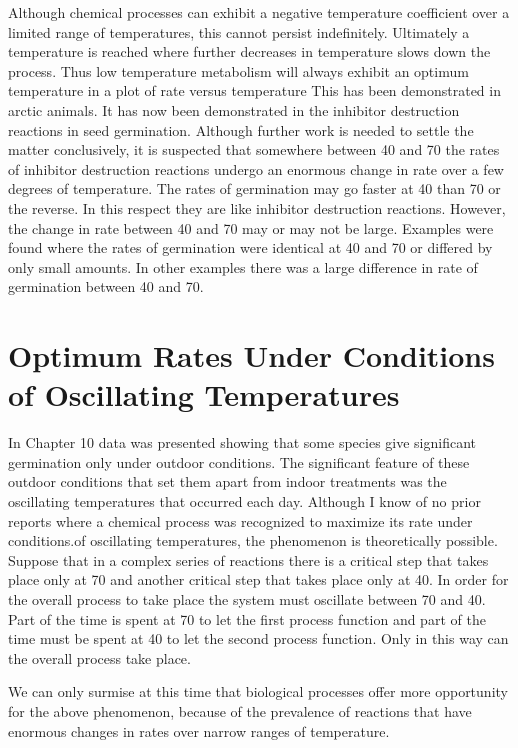 Although chemical processes can exhibit a negative temperature coefficient
over a limited range of temperatures, this cannot persist indefinitely. Ultimately a
temperature is reached where further decreases in temperature slows down the
process. Thus low temperature metabolism will always exhibit an optimum
temperature in a plot of rate versus temperature This has been demonstrated in arctic
animals. It has now been demonstrated in the inhibitor destruction reactions in seed
germination. Although further work is needed to settle the matter conclusively, it is
suspected that somewhere between 40 and 70 the rates of inhibitor destruction
reactions undergo an enormous change in rate over a few degrees of temperature.
The rates of germination may go faster at 40 than 70 or the reverse. In this
respect they are like inhibitor destruction reactions. However, the change in rate
between 40 and 70 may or may not be large. Examples were found where the rates of
germination were identical at 40 and 70 or differed by only small amounts. In other
examples there was a large difference in rate of germination between 40 and 70.

\section[Oscillating Temperatures]{Optimum Rates Under Conditions of Oscillating Temperatures}

In Chapter 10 data was presented showing that some species give significant
germination only under outdoor conditions. The significant feature of these outdoor
conditions that set them apart from indoor treatments was the oscillating temperatures
that occurred each day. Although I know of no prior reports where a chemical process
was recognized to maximize its rate under conditions.of oscillating temperatures, the
phenomenon is theoretically possible. Suppose that in a complex series of reactions
there is a critical step that takes place only at 70 and another critical step that takes
place only at 40. In order for the overall process to take place the system must oscillate
between 70 and 40. Part of the time is spent at 70 to let the first process function and
part of the time must be spent at 40 to let the second process function. Only in this way
can the overall process take place.

We can only surmise at this time that biological processes offer more
opportunity for the above phenomenon, because of the prevalence of reactions that
have enormous changes in rates over narrow ranges of temperature.

